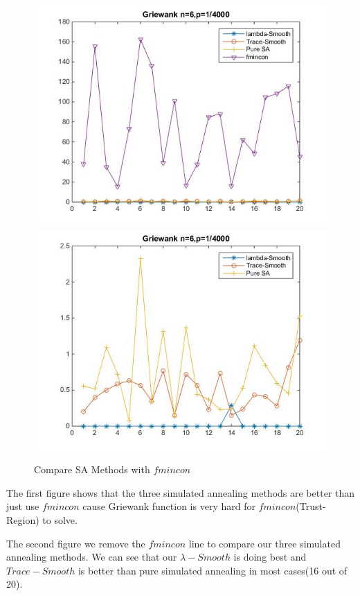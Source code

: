 \documentclass[letterpaper,12pt,titlepage,oneside,final]{book}
\begin{document}
\begin{figure}[H]
\includegraphics[scale=0.7]{griewank1.jpg}
\includegraphics[scale=0.7]{griewank2.jpg}
\caption{Compare SA Methods with $fmincon$}
\end{figure}

The first figure shows that the three simulated annealing methods are better than just use $fmincon$ cause Griewank function is very hard for $fmincon$(Trust-Region) to solve.

The second figure we remove the $fmincon$ line to compare our three simulated annealing methods. We can see that our $\lambda-Smooth$ is doing best and $Trace-Smooth$ is better than pure simulated annealing in most cases(16 out of 20).
\end{document}
